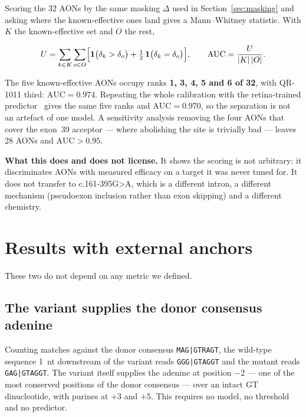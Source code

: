 \documentclass[11pt,a4paper]{article}
\begin{document}
Scoring the 32 AONs by the same masking $\Delta$ used in Section~\ref{sec:masking} and asking where
the known-effective ones land gives a Mann--Whitney statistic. With $K$ the known-effective set and
$O$ the rest,

\begin{equation}
U = \sum_{k \in K} \sum_{o \in O}
\Bigl[\mathbf{1}\bigl(\delta_k > \delta_o\bigr) + \tfrac{1}{2}\,\mathbf{1}\bigl(\delta_k = \delta_o\bigr)\Bigr],
\qquad
\mathrm{AUC} = \frac{U}{|K|\,|O|}.
\label{eq:auc}
\end{equation}

The five known-effective AONs occupy ranks \textbf{1, 3, 4, 5 and 6 of 32}, with QR-1011 third:
$\mathrm{AUC} = 0.974$. Repeating the whole calibration with the retina-trained
predictor~\cite{riepe2025} gives the same five ranks and $\mathrm{AUC} = 0.970$, so the separation
is not an artefact of one model. A sensitivity analysis removing the four AONs that cover the
exon~39 acceptor --- where abolishing the site is trivially bad --- leaves 28 AONs and
$\mathrm{AUC} > 0.95$.

\textbf{What this does and does not license.} It shows the scoring is not arbitrary: it discriminates
AONs with measured efficacy on a target it was never tuned for. It does not transfer to
c.161-395G>A, which is a different intron, a different mechanism (pseudoexon inclusion rather than
exon skipping) and a different chemistry.

\section{Results with external anchors}

These two do not depend on any metric we defined.

\subsection{The variant supplies the donor consensus adenine}

Counting matches against the donor consensus \texttt{MAG|GTRAGT}, the wild-type sequence 1~nt
downstream of the variant reads \texttt{GGG|GTAGGT} and the mutant reads \texttt{GAG|GTAGGT}. The
variant itself supplies the adenine at position $-2$ --- one of the most conserved positions of the
donor consensus --- over an intact GT dinucleotide, with purines at $+3$ and $+5$. This requires no
model, no threshold and no predictor.
\end{document}
